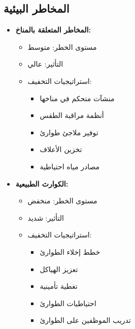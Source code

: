 \subsection{المخاطر البيئية}
\begin{itemize}
    \item \textbf{المخاطر المتعلقة بالمناخ:}
    \begin{itemize}
        \item مستوى الخطر: متوسط
        \item التأثير: عالي
        \item استراتيجيات التخفيف:
        \begin{itemize}
            \item منشآت متحكم في مناخها
            \item أنظمة مراقبة الطقس
            \item توفير ملاجئ طوارئ
            \item تخزين الأعلاف
            \item مصادر مياه احتياطية
        \end{itemize}
    \end{itemize}
    
    \item \textbf{الكوارث الطبيعية:}
    \begin{itemize}
        \item مستوى الخطر: منخفض
        \item التأثير: شديد
        \item استراتيجيات التخفيف:
        \begin{itemize}
            \item خطط إخلاء الطوارئ
            \item تعزيز الهياكل
            \item تغطية تأمينية
            \item احتياطيات الطوارئ
            \item تدريب الموظفين على الطوارئ
        \end{itemize}
    \end{itemize}
\end{itemize}

